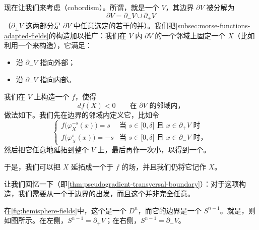 
\section{\trCobordism}
\label{sec:cobordisms}

现在让我们来考虑\textbf{\trCobordism}（cobordism）。所谓\trCobordism，就是一个\trManifoldWithBoundary{} $V$，其边界 $\partial V$ 被分解为
\[
\partial V=\partial_-V\cup\partial_+V
\]
（$\partial_\pm V$ 这两部分是 $\partial V$ 中任意选定的若干\textbf{\trConnectedComponent}的并）。我们把\cref{subsec:morse-functions-adapted-fields}的构造加以推广：我们在 $V$ 内 $\partial V$ 的一个邻域上固定一个\trVectorField{} $X$（比如利用一个\trPartitionOfUnity{}来构造），它满足：
\begin{itemize}
\item 沿 $\partial_+V$ 指向外部；
\item 沿 $\partial_-V$ 指向内部。
\end{itemize}
我们在 $V$ 上构造一个\trMorseFunction{} $f$，使得
\[
df(X)<0 \qquad\text{在 } \partial V \text{ 的邻域内，}
\]
做法如下。我们先在边界的邻域内定义它，比如令
\[
\begin{cases}
f\bigl(\varphi_X^{-s}(x)\bigr)=s & \text{当 } s\in[0,\delta[\text{ 且 } x\in\partial_+V \text{ 时}\\
f\bigl(\varphi_X^{s}(x)\bigr)=-s & \text{当 } s\in[0,\delta[\text{ 且 } x\in\partial_-V \text{ 时，}
\end{cases}
\]
然后把它任意地延拓到整个 $V$ 上，最后再作一次小\trPerturbation{}，以得到一个\trMorseFunction。

于是，我们可以把 $X$ 延拓成一个\trAdapted{}于 $f$ 的\trPseudogradient{}场，并且我们仍将它记作 $X$。

让我们回忆一下（即\cref{thm:pseudogradient-transversal-boundary}）：对于这项构造，我们需要从一个\trTransverse{}于边界的\trVectorField{}出发，而且这个\trMorseFunction{}并非完全任意。

\begin{example}\label{thm:cobordism-disk-example}
在\cref{fig:hemisphere-fields}中，这个\trManifold{}是一个\trDisk{} $D^n$，而它的边界是一个\trSphere{} $S^{n-1}$。\trMorseFunction{}就是\trHeightFunction，\trVectorField{}则如图所示。在左侧，$S^{n-1}=\partial_+V$；在右侧，$S^{n-1}=\partial_-V$。
\end{example}

